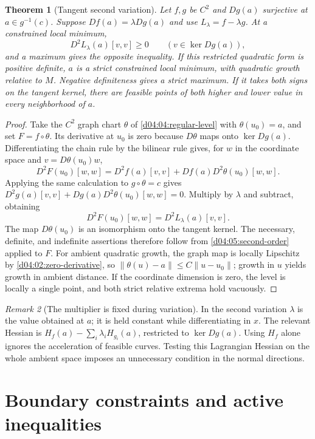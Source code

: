 \documentclass[11pt,oneside,openany]{book}
\newtheorem{theorem}{Theorem}[chapter]
\theoremstyle{definition}
\theoremstyle{remark}
\newtheorem{remark}[theorem]{Remark}
\newcommand{\norm}[1]{\lVert#1\rVert}
\newcommand{\family}[1]{}
\begin{document}
\begin{theorem}[Tangent second variation]\label{d04:05:constrained-second-variation}
Let $f,g$ be $C^2$ and $Dg(a)$ surjective at $a\in g^{-1}(c)$.
Suppose $Df(a)=\lambda Dg(a)$ and use $L_\lambda=f-\lambda g$.
At a constrained local minimum,
\[
 D^2L_\lambda(a)[v,v]\geq0\qquad(v\in\ker Dg(a)),
\]
and a maximum gives the opposite inequality. If this restricted quadratic
form is positive definite, $a$ is a strict constrained local minimum, with
quadratic growth relative to $M$. Negative definiteness gives a strict
maximum. If it takes both signs on the tangent kernel, there are feasible
points of both higher and lower value in every neighborhood of $a$.
\end{theorem}
\begin{proof}
Take the $C^2$ graph chart $\theta$ of \cref{d04:04:regular-level} with
$\theta(u_0)=a$, and set $F=f\circ\theta$. Its derivative at $u_0$
is zero because $D\theta$ maps onto $\ker Dg(a)$. Differentiating the
chain rule by the bilinear rule gives, for $w$ in the coordinate space and
$v=D\theta(u_0)w$,
\[
 D^2F(u_0)[w,w]=D^2f(a)[v,v]+Df(a)D^2\theta(u_0)[w,w].
\]
Applying the same calculation to $g\circ\theta=c$ gives
$D^2g(a)[v,v]+Dg(a)D^2\theta(u_0)[w,w]=0$.
Multiply by $\lambda$ and subtract, obtaining
\[
 D^2F(u_0)[w,w]=D^2L_\lambda(a)[v,v].
\]
The map $D\theta(u_0)$ is an isomorphism onto the tangent kernel.
The necessary, definite, and indefinite assertions therefore follow from
\cref{d04:05:second-order} applied to $F$. For ambient quadratic growth,
the graph map is locally Lipschitz by \cref{d04:02:zero-derivative}, so
$\norm{\theta(u)-a}\leq C\norm{u-u_0}$; growth in $u$ yields growth
in ambient distance. If the coordinate dimension is zero, the level is
locally a single point, and both strict relative extrema hold vacuously.
\end{proof}

\begin{remark}[The multiplier is fixed during variation]\label{d04:05:fixed-multiplier}
In the second variation $\lambda$ is the value obtained at $a$; it is held
constant while differentiating in $x$. The relevant Hessian is
$H_f(a)-\sum_i\lambda_iH_{g_i}(a)$, restricted to $\ker Dg(a)$.
Using $H_f$ alone ignores the acceleration of feasible curves. Testing
this Lagrangian Hessian on the whole ambient space imposes an unnecessary
condition in the normal directions.
\end{remark}

\section{Boundary constraints and active inequalities}
\family{K04.05.10}
\end{document}
